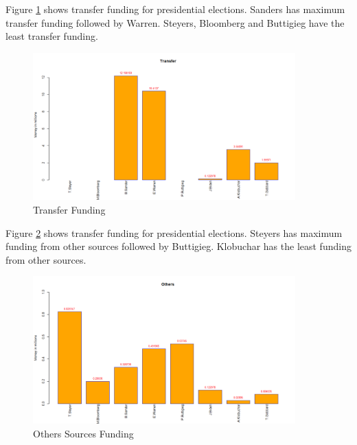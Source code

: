 Figure \ref{Transfer} shows transfer funding for presidential elections. Sanders has maximum transfer funding followed by Warren. Steyers, Bloomberg and Buttigieg  have the least transfer funding. 
\begin{figure}[H]
    \centering
    \includegraphics[width=0.9\textwidth]{figures/Transfer.png}
    \caption{Transfer Funding}
    \label{Transfer}
\end{figure}
Figure \ref{Others} shows transfer funding for presidential elections. Steyers has maximum funding from other sources followed by Buttigieg. Klobuchar has the least funding from other sources. 
\begin{figure}[H]
    \centering
    \includegraphics[width=0.9\textwidth]{figures/Others.png}
    \caption{Others Sources Funding}
    \label{Others}
\end{figure}
